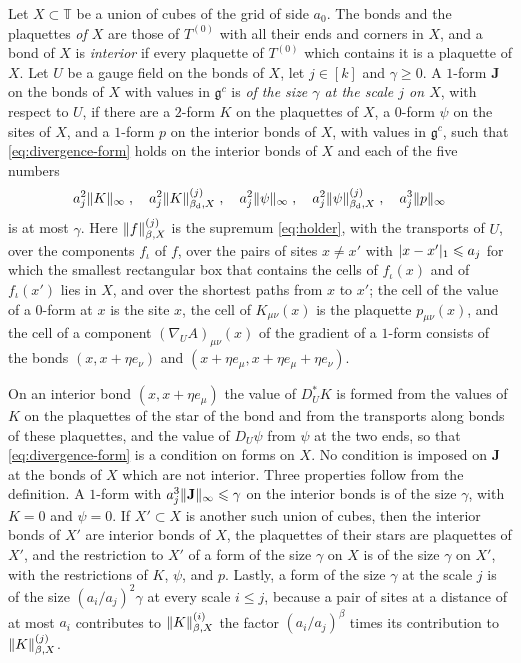 \documentclass[11pt]{preprint}
\DeclarePairedDelimiter{\abs}{\lvert}{\rvert}
\DeclarePairedDelimiter{\norm}{\lVert}{\rVert}
\numberwithin{equation}{section}
\begin{document}
\begin{definition}\label{def:local-divergence-form}
Let $X \subset \mathbb T$ be a union of cubes of the grid of side $a_0$. The bonds and the plaquettes \emph{of $X$} are those of $T^{(0)}$ with all their ends and corners in $X$, and a bond of $X$ is \emph{interior} if every plaquette of $T^{(0)}$ which contains it is a plaquette of $X$. Let $U$ be a gauge field on the bonds of $X$, let $j \in [k]$ and $\gamma \geqslant 0$. A $1$-form $\mathbf J$ on the bonds of $X$ with values in $\mathfrak g^c$ is \emph{of the size $\gamma$ at the scale $j$ on $X$}, with respect to $U$, if there are a $2$-form $K$ on the plaquettes of $X$, a $0$-form $\psi$ on the sites of $X$, and a $1$-form $p$ on the interior bonds of $X$, with values in $\mathfrak g^c$, such that \eqref{eq:divergence-form} holds on the interior bonds of $X$ and each of the five numbers
\begin{equation}\label{eq:local-divergence-size}
    a_j^2\norm K_\infty\;,\quad
    a_j^2\norm K^{(j)}_{\beta_{\mathrm d},X}\;,\quad
    a_j^2\norm\psi_\infty\;,\quad
    a_j^2\norm\psi^{(j)}_{\beta_{\mathrm d},X}\;,\quad
    a_j^3\norm p_\infty
\end{equation}
is at most $\gamma$. Here $\norm f^{(j)}_{\beta,X}$ is the supremum \eqref{eq:holder}, with the transports of $U$, over the components $f_\iota$ of $f$, over the pairs of sites $x \neq x'$ with $\abs{x - x'}_1 \leqslant a_j$ for which the smallest rectangular box that contains the cells of $f_\iota(x)$ and of $f_\iota(x')$ lies in $X$, and over the shortest paths from $x$ to $x'$; the cell of the value of a $0$-form at $x$ is the site $x$, the cell of $K_{\mu\nu}(x)$ is the plaquette $p_{\mu\nu}(x)$, and the cell of a component $(\nabla_UA)_{\mu\nu}(x)$ of the gradient of a $1$-form consists of the bonds $(x, x + \eta e_\nu)$ and $(x + \eta e_\mu, x + \eta e_\mu + \eta e_\nu)$.
\end{definition}

On an interior bond $(x, x + \eta e_\mu)$ the value of $D^*_UK$ is formed from the values of $K$ on the plaquettes of the star of the bond and from the transports along bonds of these plaquettes, and the value of $D_U\psi$ from $\psi$ at the two ends, so that \eqref{eq:divergence-form} is a condition on forms on $X$. No condition is imposed on $\mathbf J$ at the bonds of $X$ which are not interior. Three properties follow from the definition. A $1$-form with $a_j^3\norm{\mathbf J}_\infty \leqslant \gamma$ on the interior bonds is of the size $\gamma$, with $K = 0$ and $\psi = 0$. If $X' \subset X$ is another such union of cubes, then the interior bonds of $X'$ are interior bonds of $X$, the plaquettes of their stars are plaquettes of $X'$, and the restriction to $X'$ of a form of the size $\gamma$ on $X$ is of the size $\gamma$ on $X'$, with the restrictions of $K$, $\psi$, and $p$. Lastly, a form of the size $\gamma$ at the scale $j$ is of the size $(a_i/a_j)^2\gamma$ at every scale $i \leqslant j$, because a pair of sites at a distance of at most $a_i$ contributes to $\norm K^{(i)}_{\beta,X}$ the factor $(a_i/a_j)^\beta$ times its contribution to $\norm K^{(j)}_{\beta,X}$.
\end{document}
